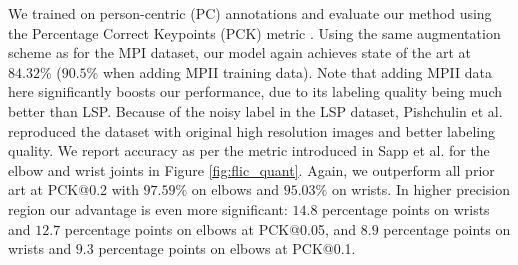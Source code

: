 \documentclass[10pt,twocolumn,letterpaper]{article}
\begin{document}
We trained on person-centric (PC) annotations and evaluate our method using the Percentage Correct Keypoints (PCK) metric \cite{yang2013articulated}.
%
Using the same augmentation scheme as for the MPI dataset, our model again achieves state of the art at $84.32\%$ ($90.5\%$ when adding MPII training data). Note that adding MPII data here significantly boosts our performance, due to its labeling quality being much better than LSP. Because of the noisy label in the LSP dataset, Pishchulin et al. \cite{pishchulin2015deepcut} reproduced the dataset with original high resolution images and better labeling quality.
We report accuracy as per the metric introduced in Sapp et al. \cite{sappmodec} for the elbow and wrist joints in Figure \ref{fig:flic_quant}. Again, we outperform all prior art at PCK@0.2 with $97.59\%$ on elbows and $95.03\%$ on wrists. In higher precision region our advantage is even more significant: $14.8$ percentage points on wrists and $12.7$ percentage points on elbows at PCK@0.05, and $8.9$ percentage points on wrists and $9.3$ percentage points on elbows at PCK@0.1.
\end{document}
